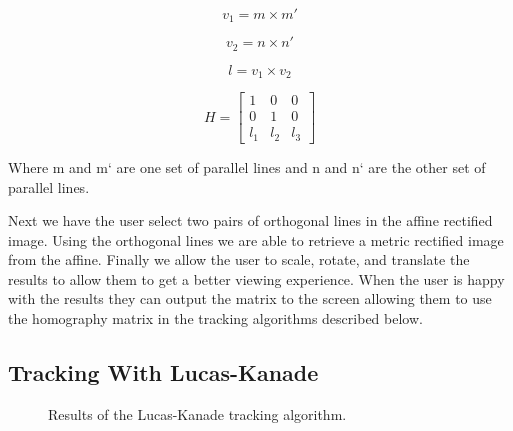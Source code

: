 \documentclass[12pt, onecolumn, conference]{IEEEtran}
\begin{document}
\begin{equation}
v_1 = m \times m'
\end{equation}

\begin{equation}
v_2 = n \times n'
\end{equation}

\begin{equation}
l = v_1 \times v_2
\end{equation}

\begin{equation}
H =
\begin{bmatrix}
1 & 0 & 0\\ 
0 & 1 & 0\\ 
l_1 & l_2 & l_3 
\end{bmatrix}
\end{equation}

Where m and m` are one set of parallel lines and n  and n` are the other set of parallel lines.

Next we have the user select two pairs of orthogonal lines in the affine rectified image. Using the orthogonal lines we are able to retrieve a metric rectified image from the affine. Finally we allow the user to scale, rotate, and translate the results to allow them to get a better viewing experience. When the user is happy with the results they can output the matrix to the screen allowing them to use the homography matrix in the tracking algorithms described below.

\subsection{Tracking With Lucas-Kanade}

\begin{figure}[!t]
\centering
{}
\hfil
{}
\caption{Results of the Lucas-Kanade tracking algorithm.}
\label{LK Tracking}
\end{figure}
\end{document}
